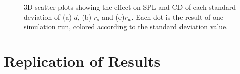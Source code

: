 \begin{figure}[hbt!]\centering
    \par

    \hfill

    \caption{3D scatter plots showing the effect on SPL and CD of each
    standard deviation of
    (a) $d$, (b) $r_s$ and (c)$r_w$. Each dot is the result of one simulation run, colored
    according to the standard deviation value.}
    \label{figure}
\end{figure}

\section{Replication of Results}\label{sec:confirm}

